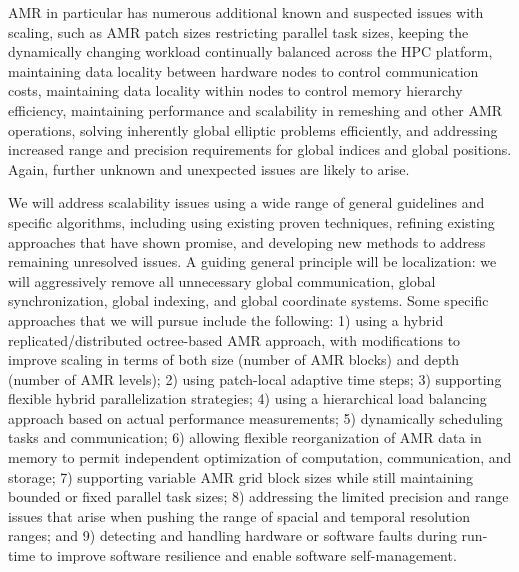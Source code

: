 \documentclass[11pt,letterpaper]{article}
\begin{document}
 AMR in particular has numerous additional
known and suspected issues with scaling, such as
%
AMR patch sizes restricting parallel task sizes,
%
keeping the dynamically changing workload continually balanced across
the HPC platform,
%
maintaining data locality between hardware nodes to control
communication costs,
%
maintaining data locality within nodes to control memory hierarchy
efficiency,
%
maintaining performance and scalability in remeshing and other AMR
operations,
%
solving inherently global elliptic problems efficiently,
%
and addressing increased range and precision requirements for global
indices and global positions.
%
Again, further unknown and unexpected issues are likely to arise.

 We will address scalability issues
using a wide range of general guidelines and specific algorithms,
including using existing proven techniques, refining existing
approaches that have shown promise, and developing new methods to
address remaining unresolved issues.  A guiding general principle will
be localization: we will aggressively remove all unnecessary global
communication, global synchronization, global indexing, and global
coordinate systems.  Some specific approaches that we will pursue
include the following:
%
1) using a hybrid replicated/distributed octree-based AMR approach, with
modifications to improve scaling in terms of both size (number of AMR
blocks) and depth (number of AMR levels);
% 
2) using patch-local adaptive time steps;
% 
3) supporting flexible hybrid parallelization strategies;
% 
4) using a hierarchical load balancing approach based on actual
performance measurements;
% 
5) dynamically scheduling tasks and communication;
% 
6) allowing flexible reorganization of AMR data in memory to permit
independent optimization of computation, communication, and storage;
% 
7) supporting variable AMR grid block sizes while still maintaining
bounded or fixed parallel task sizes;
% 
8) addressing the limited precision and range issues that arise when
pushing the range of spacial and temporal resolution ranges;
% 
and 9) detecting and handling hardware or software faults during
run-time to improve software resilience and enable software
self-management.

\end{document}

